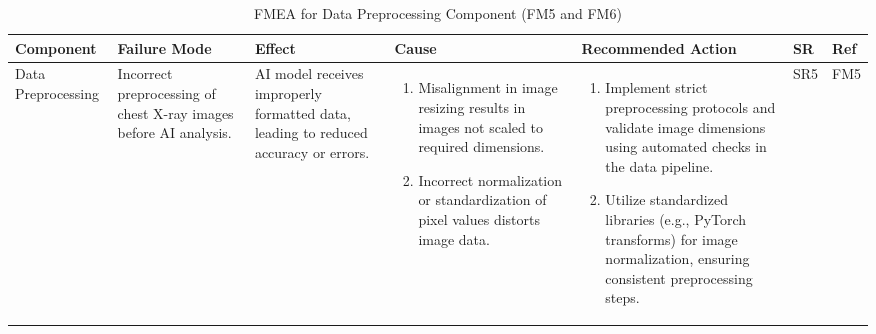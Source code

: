 \documentclass{article}
\begin{document}
\begin{landscape}
    \begin{table}[ht]
    \centering
    \caption{FMEA for Data Preprocessing Component (FM5 and FM6)}
    \renewcommand{\arraystretch}{1.1}
    {
    \setlength{\tabcolsep}{2pt}
    \begin{tabular}{|p{2.5cm}|p{2.5cm}|p{3cm}|p{5cm}|p{6cm}|p{1cm}|p{1cm}|}
    \hline
    \textbf{Component} & \textbf{Failure Mode} & \textbf{Effect} & \textbf{Cause} & \textbf{Recommended Action} & \textbf{SR} & \textbf{Ref} \\
    \hline

    Data Preprocessing
     & Incorrect preprocessing of chest X-ray images before AI analysis.
     & AI model receives improperly formatted data, leading to reduced accuracy or errors.
     &
     \begin{enumerate}[leftmargin=*, label={\alph*.}, itemsep=1pt]
         \item Misalignment in image resizing results in images not scaled to required dimensions.
         \item Incorrect normalization or standardization of pixel values distorts image data.
     \end{enumerate}
     &
     \begin{enumerate}[leftmargin=*, label={\alph*.}, itemsep=1pt]
         \item Implement strict preprocessing protocols and validate image dimensions using automated checks in the data pipeline.
         \item Utilize standardized libraries (e.g., PyTorch transforms) for image normalization, ensuring consistent preprocessing steps.
     \end{enumerate}
     & SR5 & FM5 \\ \hline


\end{tabular}}
\end{table}
\end{landscape}
\end{document}
